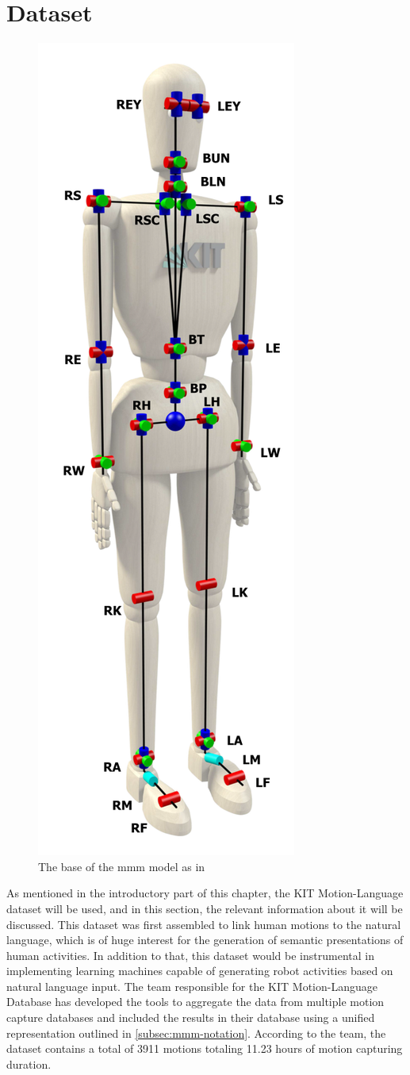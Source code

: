 	\section{Dataset}
		\begin{figure}
			\vspace{-5.5cm}
			\begin{center}
				\includegraphics[width=.32\textwidth]{img/mmm-model.png}
				\caption{The base of the mmm model as in \cite{Plappert2016}}
				\label{fig:mmm-model}
			\end{center}
		\end{figure}
		As mentioned in the introductory part of this chapter, the KIT Motion-Language dataset\cite{Plappert2016} will be used, and in this section, the relevant information about it will be discussed. This dataset was first assembled to link human motions to the natural language, which is of huge interest for the generation of semantic presentations of human activities. In addition to that, this dataset would be instrumental in implementing learning machines capable of generating robot activities based on natural language input\cite{Plappert2016}. The team responsible for the KIT Motion-Language Database has developed the tools to aggregate the data from multiple motion capture databases and included the results in their database using a unified representation outlined in \ref{subsec:mmm-notation}. According to the team, the dataset contains a total of 3911 motions totaling 11.23 hours of motion capturing duration\cite{Plappert2016}.
